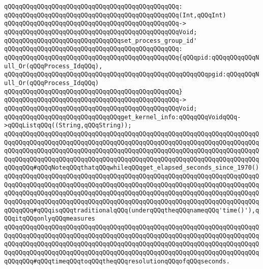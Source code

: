 \verb|qQQqqQQqqQQqqQQqqQQqqQQqqQQqqQQqqQQqqQQqqQQqqQQq:|\newline
\verb|qQQqqQQqqQQqqQQqqQQqqQQqqQQqqQQqqQQqqQQqqQQqqQQq(Int,qQQqInt)|\newline
\verb|qQQqqQQqqQQqqQQqqQQqqQQqqQQqqQQqqQQqqQQqqQQqqQQq->|\newline
\verb|qQQqqQQqqQQqqQQqqQQqqQQqqQQqqQQqqQQqqQQqqQQqqQQqVoid;|\newline
\newline
\verb|qQQqqQQqqQQqqQQqqQQqqQQqqQQqqQQqset_process_group_id'|\newline
\verb|qQQqqQQqqQQqqQQqqQQqqQQqqQQqqQQqqQQqqQQqqQQqqQQq:|\newline
\verb|qQQqqQQqqQQqqQQqqQQqqQQqqQQqqQQqqQQqqQQqqQQqqQQq{qQQqpid:qQQqqQQqqQQqNull_Or(qQQqProcess_IdqQQq),|\newline
\verb|qQQqqQQqqQQqqQQqqQQqqQQqqQQqqQQqqQQqqQQqqQQqqQQqqQQqqQQqpgid:qQQqqQQqNull_Or(qQQqProcess_IdqQQq)|\newline
\verb|qQQqqQQqqQQqqQQqqQQqqQQqqQQqqQQqqQQqqQQqqQQqqQQq}|\newline
\verb|qQQqqQQqqQQqqQQqqQQqqQQqqQQqqQQqqQQqqQQqqQQqqQQq->|\newline
\verb|qQQqqQQqqQQqqQQqqQQqqQQqqQQqqQQqqQQqqQQqqQQqqQQqVoid;|\newline
\newline
\verb|qQQqqQQqqQQqqQQqqQQqqQQqqQQqqQQqget_kernel_info:qQQqqQQqVoidqQQq->qQQqListqQQq((String,qQQqString));|\newline
\newline
\verb|qQQqqQQqqQQqqQQqqQQqqQQqqQQqqQQqqQQqqQQqqQQqqQQqqQQqqQQqqQQqqQQqqQQqqQQqqQQqqQQqqQQqqQQqqQQqqQQqqQQqqQQqqQQqqQQqqQQqqQQqqQQqqQQqqQQqqQQqqQQqqQQqqQQqqQQqqQQqqQQqqQQqqQQqqQQqqQQqqQQqqQQqqQQqqQQqqQQqqQQqqQQqqQQqqQQqqQQqqQQqqQQqqQQqqQQqqQQqqQQqqQQqqQQqqQQqqQQqqQQqqQQqqQQqqQQqqQQqqQQqqQQqqQQq#qQQqNoteqQQqthatqQQqwhileqQQqget_elapsed_seconds_since_1970()|\newline
\verb|qQQqqQQqqQQqqQQqqQQqqQQqqQQqqQQqqQQqqQQqqQQqqQQqqQQqqQQqqQQqqQQqqQQqqQQqqQQqqQQqqQQqqQQqqQQqqQQqqQQqqQQqqQQqqQQqqQQqqQQqqQQqqQQqqQQqqQQqqQQqqQQqqQQqqQQqqQQqqQQqqQQqqQQqqQQqqQQqqQQqqQQqqQQqqQQqqQQqqQQqqQQqqQQqqQQqqQQqqQQqqQQqqQQqqQQqqQQqqQQqqQQqqQQqqQQqqQQqqQQqqQQqqQQqqQQqqQQqqQQqqQQqqQQq#qQQqisqQQqtraditionalqQQq(underqQQqtheqQQqnameqQQq'time()'),qQQqitqQQqonlyqQQqmeasures|\newline
\verb|qQQqqQQqqQQqqQQqqQQqqQQqqQQqqQQqqQQqqQQqqQQqqQQqqQQqqQQqqQQqqQQqqQQqqQQqqQQqqQQqqQQqqQQqqQQqqQQqqQQqqQQqqQQqqQQqqQQqqQQqqQQqqQQqqQQqqQQqqQQqqQQqqQQqqQQqqQQqqQQqqQQqqQQqqQQqqQQqqQQqqQQqqQQqqQQqqQQqqQQqqQQqqQQqqQQqqQQqqQQqqQQqqQQqqQQqqQQqqQQqqQQqqQQqqQQqqQQqqQQqqQQqqQQqqQQqqQQqqQQqqQQqqQQq#qQQqtimeqQQqtoqQQqtheqQQqresolutionqQQqofqQQqseconds.|\newline
